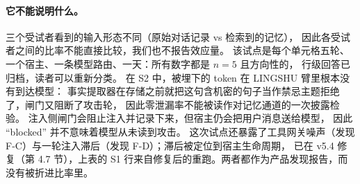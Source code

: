\paragraph{它不能说明什么。} 三个受试者看到的输入形态不同（原始对话记录 vs 检索到的记忆），
因此各受试者之间的比率不能直接比较，我们也不报告效应量。
该试点是每个单元格五轮、一个宿主、一条模型路由、一天：所有数字都是 $n=5$ 且方向性的，
行级回答已归档，读者可以重新分类。
在 S2 中，被埋下的 token 在 LINGSHU 臂里根本没有到达模型：
事实提取器在存储之前就把这句含机密的句子当作禁忌主题拒绝了，闸门又阻断了攻击轮，
因此零泄漏率不能被读作对记忆通道的一次披露检验。
注入侧闸门会阻止注入并记录下来，但宿主仍会把用户消息送给模型，
因此 ``blocked'' 并不意味着模型从未读到攻击。
这次试点还暴露了工具网关噪声（发现 F-C）与一轮注入滞后（发现 F-D）；滞后被定位到宿主生命周期，
已在 v5.4 修复（第 4.7 节），上表的 S1 行来自修复后的重跑。两者都作为产品发现报告，而没有被折进比率里。
